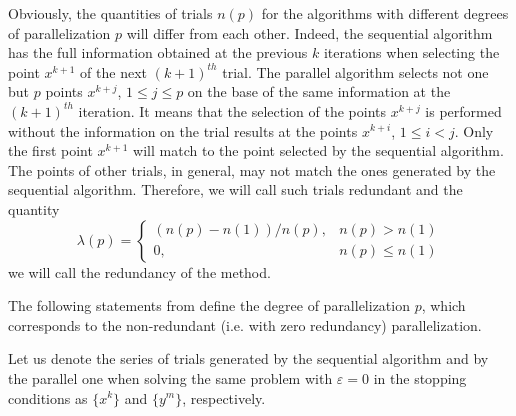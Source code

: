 \documentclass[runningheads]{llncs}
\begin{document}
Obviously, the quantities of trials $n(p)$ for the algorithms with different degrees of parallelization $p$ will differ from each other. Indeed, the sequential algorithm has the full information obtained at the previous $k$ iterations when selecting the point $x^{k+1}$ of the next $(k+1)^{th}$ trial. The parallel algorithm selects not one but $p$ points $x^{k+j}$, $1 \leq j \leq p$ on the base of the same information at the $(k+1)^{th}$ iteration. It means that the selection of the points $x^{k+j}$ is performed without the information on the trial results at the points $x^{k+i}$, $1 \leq i < j$. Only the first point $x^{k+1}$ will match to the point selected by the sequential algorithm. The points of other trials, in general, may not match the ones generated by the sequential algorithm. Therefore, we will call such trials redundant and the quantity
\begin{displaymath}
\lambda(p) = \left\{ \begin{array}{ll}
                (n(p) - n(1)) / n(p), & \textrm{$n(p) > n(1)$}\\
                0, & \textrm{$n(p) \leq n(1)$}
  \end{array} \right.
\end{displaymath}
we will call the redundancy of the method.

The following statements from \cite{Strongin2000} define the degree of parallelization $p$, which corresponds to the non-redundant (i.e. with zero redundancy) parallelization.

Let us denote the series of trials generated by the sequential algorithm and by the parallel one when solving the same problem with $\varepsilon=0$ in the stopping conditions as $\{x^k\}$ and $\{y^m\}$, respectively.
\end{document}

